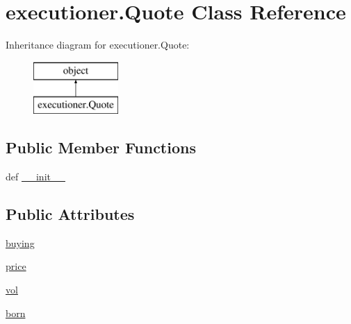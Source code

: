 \hypertarget{classexecutioner_1_1_quote}{\section{executioner.\-Quote Class Reference}
\label{classexecutioner_1_1_quote}
}
Inheritance diagram for executioner.\-Quote\-:\begin{figure}[H]
\begin{center}
\leavevmode
\includegraphics[height=2.000000cm]{classexecutioner_1_1_quote}
\end{center}
\end{figure}
\subsection*{Public Member Functions}
\begin{DoxyCompactItemize}
\item 
def \hyperlink{classexecutioner_1_1_quote_a4eb9da1d99b71386cd1eca72e9bf8ad8}{\-\_\-\-\_\-init\-\_\-\-\_\-}
\end{DoxyCompactItemize}
\subsection*{Public Attributes}
\begin{DoxyCompactItemize}
\item 
\hyperlink{classexecutioner_1_1_quote_a3c70c5196ea5d387a1e9433019abdb95}{buying}
\item 
\hyperlink{classexecutioner_1_1_quote_ac72ccb110faea8cc62eec1c1c7f72b7b}{price}
\item 
\hyperlink{classexecutioner_1_1_quote_ace7df6d08729cfc59d6373b36e56b81d}{vol}
\item 
\hyperlink{classexecutioner_1_1_quote_ae7cb10d664fb10d78bf5090365141880}{born}
\end{DoxyCompactItemize}


